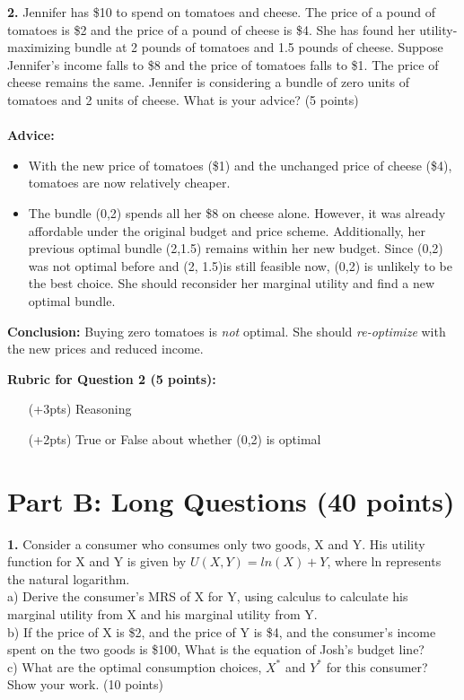 \documentclass[12pt]{article}
\begin{document}
\noindent\textbf{2.} Jennifer has \$10 to spend on tomatoes and cheese. The price of a pound of tomatoes is \$2 and the price of a pound of cheese is \$4. She has found her utility-maximizing bundle at 2 pounds of tomatoes and 1.5 pounds of cheese. Suppose Jennifer's income falls to \$8 and the price of tomatoes falls to \$1. The price of cheese remains the same. Jennifer is considering a bundle of zero units of tomatoes and 2 units of cheese. What is your advice? (5 points)
\noindent
\\\\\textbf{Advice:}\\
\begin{itemize}[noitemsep]
\vspace{-15pt}
\item With the new price of tomatoes (\$1) and the unchanged price of cheese (\$4), tomatoes are now relatively cheaper.
\item The bundle (0,2) spends all her \$8 on cheese alone. However, it was already affordable under the original budget and price scheme. Additionally, her previous optimal bundle (2,1.5) remains within her new budget. Since (0,2) was not optimal before and (2, 1.5)is still feasible now, (0,2) is unlikely to be the best choice. She should reconsider her marginal utility and find a new optimal bundle.
\end{itemize}
\textbf{Conclusion:} Buying zero tomatoes is \emph{not} optimal. She should \emph{re-optimize} with the new prices and reduced income.

\vspace{1em}
\noindent
\textbf{Rubric for Question 2 (5 points):}
\begin{itemize}[noitemsep]
    \item[(+3pts)] Reasoning
    \item[(+2pts)] True or False about whether (0,2) is optimal
\end{itemize}

\hrulefill

\section*{Part B: Long Questions (40 points)}

\textbf{1.} Consider a consumer who consumes only two goods, X and Y. His utility function for X and Y is given by $U(X,Y)= ln (X) + Y$, where ln represents the natural logarithm. 
\\a) Derive the consumer’s MRS of X for Y, using calculus to calculate his marginal utility from X and his marginal utility from Y. 
\\b) If the price of X is \$2, and the price of Y is \$4, and the consumer’s income spent on the two goods is \$100, What is the equation of Josh’s budget line? 
\\c) What are the optimal consumption choices, $X^*$ and $Y^*$ for this consumer? Show your work. (10 points)
\end{document}
